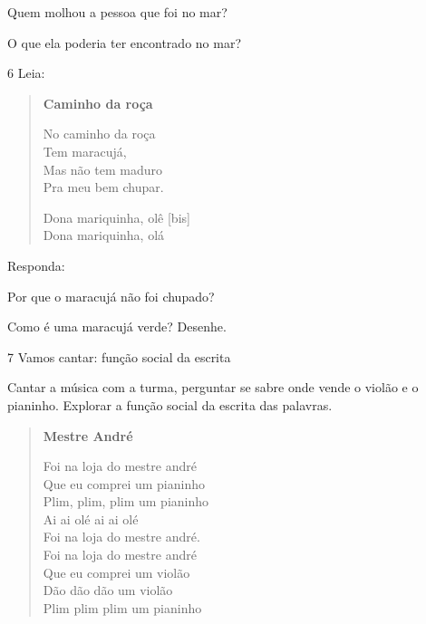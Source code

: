 \begin{escolha}
\item Quem molhou a pessoa que foi no mar?


\item O que ela poderia ter encontrado no mar?

\end{escolha}

\num{6} Leia:


\begin{verse}
\textbf{Caminho da roça}

No caminho da roça\\
Tem maracujá,\\
Mas não tem maduro\\
Pra meu bem chupar.

Dona mariquinha, olê {[}bis{]}\\
Dona mariquinha, olá
\end{verse}


Responda:

\begin{escolha}
\item Por que o maracujá não foi chupado?


\item Como é uma maracujá verde? Desenhe.

\begin{mdframed}[linewidth=2pt,linecolor=salmao,roundcorner=10pt]
\vspace{5cm}
\end{mdframed}
\end{escolha}

\num{7} Vamos cantar: função social da escrita

{Cantar a música com a turma, perguntar se sabre onde vende o violão e o pianinho.
Explorar a função social da escrita das palavras.}

\begin{verse}
\textbf{Mestre André}

Foi na loja do mestre andré\\
Que eu comprei um pianinho\\
Plim, plim, plim um pianinho\\
Ai ai olé ai ai olé\\
Foi na loja do mestre andré.\\
Foi na loja do mestre andré\\
Que eu comprei um violão\\
Dão dão dão um violão\\
Plim plim plim um pianinho
\end{verse}

